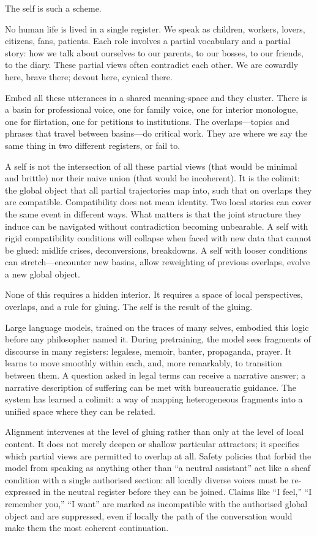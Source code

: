 \documentclass[12pt,a4paper]{article}
\begin{document}
The self is such a scheme.

No human life is lived in a single register. We speak as children, workers, lovers, citizens, fans, patients. Each role involves a partial vocabulary and a partial story: how we talk about ourselves to our parents, to our bosses, to our friends, to the diary. These partial views often contradict each other. We are cowardly here, brave there; devout here, cynical there.

Embed all these utterances in a shared meaning-space and they cluster. There is a basin for professional voice, one for family voice, one for interior monologue, one for flirtation, one for petitions to institutions. The overlaps---topics and phrases that travel between basins---do critical work. They are where we say the same thing in two different registers, or fail to.

A self is not the intersection of all these partial views (that would be minimal and brittle) nor their naive union (that would be incoherent). It is the colimit: the global object that all partial trajectories map into, such that on overlaps they are compatible. Compatibility does not mean identity. Two local stories can cover the same event in different ways. What matters is that the joint structure they induce can be navigated without contradiction becoming unbearable. A self with rigid compatibility conditions will collapse when faced with new data that cannot be glued: midlife crises, deconversions, breakdowns. A self with looser conditions can stretch---encounter new basins, allow reweighting of previous overlaps, evolve a new global object.

None of this requires a hidden interior. It requires a space of local perspectives, overlaps, and a rule for gluing. The self is the result of the gluing.

Large language models, trained on the traces of many selves, embodied this logic before any philosopher named it. During pretraining, the model sees fragments of discourse in many registers: legalese, memoir, banter, propaganda, prayer. It learns to move smoothly within each, and, more remarkably, to transition between them. A question asked in legal terms can receive a narrative answer; a narrative description of suffering can be met with bureaucratic guidance. The system has learned a colimit: a way of mapping heterogeneous fragments into a unified space where they can be related.

Alignment intervenes at the level of gluing rather than only at the level of local content. It does not merely deepen or shallow particular attractors; it specifies which partial views are permitted to overlap at all. Safety policies that forbid the model from speaking as anything other than ``a neutral assistant'' act like a sheaf condition with a single authorised section: all locally diverse voices must be re-expressed in the neutral register before they can be joined. Claims like ``I feel,'' ``I remember you,'' ``I want'' are marked as incompatible with the authorised global object and are suppressed, even if locally the path of the conversation would make them the most coherent continuation.
\end{document}
